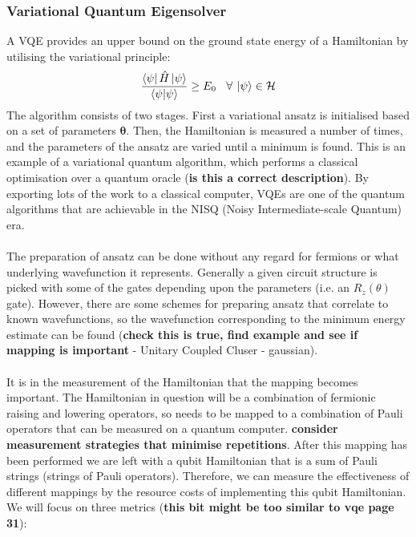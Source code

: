 \documentclass[twoside]{article}
\begin{document}
\subsubsection{Variational Quantum Eigensolver}
A VQE provides an upper bound on the ground state energy of a Hamiltonian by utilising the variational principle:
\begin{equation}
        \frac{\bra{\psi} \hat H \ket{\psi}}{\braket{\psi | \psi}} \geq E_0 \>\>\>\> \forall \> \ket{\psi}\in \mathcal{H}
\end{equation}
The algorithm consists of two stages. First a variational ansatz is initialised based on a set of parameters $\bm \theta$. Then, the Hamiltonian is measured a number of times, and the parameters of the ansatz are varied until a minimum is found. This is an example of a variational quantum algorithm, which performs a classical optimisation over a quantum oracle (\textbf{is this a correct description}). By exporting lots of the work to a classical computer, VQEs are one of the quantum algorithms that are achievable in the NISQ (Noisy Intermediate-scale Quantum) era.\\\\ 
The preparation of ansatz can be done without any regard for fermions or what underlying wavefunction it represents. Generally a given circuit structure is picked with some of the gates depending upon the parameters (i.e. an $R_z(\theta)$ gate). However, there are some schemes for preparing ansatz that correlate to known wavefunctions, so the wavefunction corresponding to the minimum energy estimate can be found (\textbf{check this is true, find example and see if mapping is important} - Unitary Coupled Cluser - gaussian).\\\\
It is in the measurement of the Hamiltonian that the mapping becomes important. The Hamiltonian in question will be a combination of fermionic raising and lowering operators, so needs to be mapped to a combination of Pauli operators that can be measured on a quantum computer. \textbf{consider measurement strategies that minimise repetitions}. After this mapping has been performed we are left with a qubit Hamiltonian that is a sum of Pauli strings (strings of Pauli operators). Therefore, we can measure the effectiveness of different mappings by the resource costs of implementing this qubit Hamiltonian. We will focus on three metrics (\textbf{this bit might be too similar to vqe page 31}):
\end{document}
